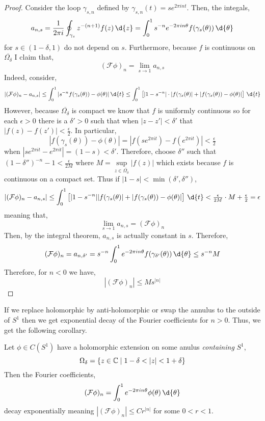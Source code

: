 \documentclass[12pt]{article}
\renewcommand{\F}{\mathcal{F}}
\begin{document}
\begin{proof}
Consider the loop $\gamma_{s, n}$ defined by $\gamma_{s, n}(t) = s e^{2 \pi i n t}$. Then, the integals,
\[ a_{n, s} = \frac{1}{2 \pi i} \oint_{\gamma_s} z^{-(n+1)} f(z) \, \d{z} = \int_0^{1} s^{-n} e^{-2 \pi i n \theta} f(\gamma_s(\theta)) \, \d{\theta}  \]
for $s \in (1 - \delta, 1)$ do not depend on $s$. Furthermore, because $f$ is continuous on $\overline{\Omega_\delta}$ I claim that, 
\[ (\F \phi)_n = \lim_{s \to 1} a_{n,s} \]
Indeed, consider,
\[ |(\F \phi)_n - a_{n, s}| \le \int_0^1 | s^{-n} f(\gamma_s(\theta)) - \phi(\theta) | \, \d{t} \le \int_0^1 \left[ |1 - s^{-n}| \cdot |f(\gamma_s(\theta)| + |f(\gamma_s(\theta)) - \phi(\theta) | \right] \, \d{t} \]
However, because $\overline{\Omega_\delta}$ is compact we know that $f$ is  uniformly continuous so for each $\epsilon > 0$ there is a $\delta' > 0$ such that when $| z - z'| < \delta'$ that $|f(z) - f(z')| < \frac{\epsilon}{2}$. In particular, 
\[ | f(\gamma_s(\theta)) - \phi(\theta)| = | f(s e^{2 \pi i t}) - f(e^{2 \pi i t}) | < \tfrac{\epsilon}{2} \]
when $| s e^{2 \pi i t} - e^{2 \pi i t} | = (1 - s) < \delta'$. Therefore, choose $\delta''$ such that $(1 - \delta'')^{-n} - 1 < \frac{\epsilon}{2 M}$ where $M = \sup\limits_{z \in \overline{\Omega_\delta}} | f(z) |$ which exists because $f$ is continuous on a compact set. Thus if $|1 - s| < \min{(\delta', \delta'')}$,
\[ |(\F \phi)_n - a_{n, s}| \le \int_0^1 \left[ | 1 - s^{-n}| |f(\gamma_s(\theta)| + |f(\gamma_s(\theta)) - \phi(\theta) | \right] \, \d{t} < \tfrac{\epsilon}{2 M} \cdot M + \tfrac{\epsilon}{2} = \epsilon \]
meaning that,
\[ \lim_{s \to 1} a_{n,s} = (\F \phi)_n \]
Then, by the integral theorem, $a_{n,s}$ is actually constant in $s$. Therefore, 
\[ (\F \phi)_n = a_{n, \delta'} = s^{-n} \int_0^1 e^{-2\pi i n \theta} f(\gamma_{\delta'}(\theta)) \, \d{\theta} \le s^{-n} M \]
Therefore, for $n < 0$ we have,
\[ | (\F \phi)_n | \le M s^{|n|} \]
\end{proof}

\begin{rmk}
If we replace holomorphic by anti-holomorphic or swap the annulus to the outside of $S^1$ then we get exponential decay of the Fourier coefficients for $n > 0$. Thus, we get the following corollary.
\end{rmk}

\begin{cor}
Let $\phi \in C(S^1)$ have a holomorphic extension on some anulus \textit{containing} $S^1$,
\[ \Omega_\delta = \{ z \in \mathbb{C} \mid 1 - \delta < | z | < 1 + \delta \} \]
Then the Fourier coefficients,
\[ (\F \phi)_n = \int_0^1 e^{- 2 \pi i n \theta} \phi(\theta) \, \d{\theta} \]
decay exponentially meaning $| (\F \phi)_n | \le C r^{|n|}$ for some $0 < r < 1$.
\end{cor}
\end{document}
